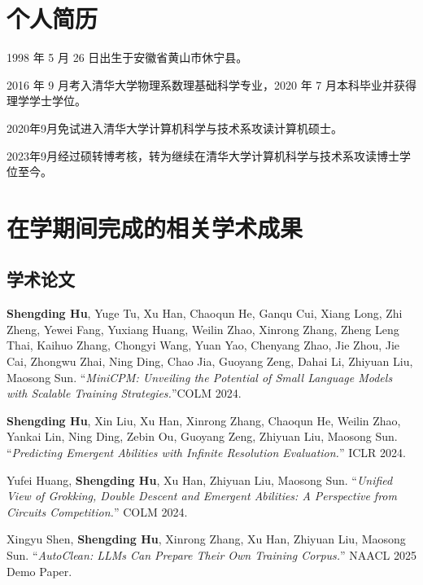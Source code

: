 
\begin{resume}

  \section*{个人简历}

  1998 年 5 月 26 日出生于安徽省黄山市休宁县。

  2016 年 9 月考入清华大学物理系数理基础科学专业，2020 年 7 月本科毕业并获得理学学士学位。

  2020年9月免试进入清华大学计算机科学与技术系攻读计算机硕士。

  2023年9月经过硕转博考核，转为继续在清华大学计算机科学与技术系攻读博士学位至今。


  \section*{在学期间完成的相关学术成果}

  \subsection*{学术论文}

  \begin{achievements}
      \item \textbf{Shengding Hu}, Yuge Tu, Xu Han, Chaoqun He, Ganqu Cui, Xiang Long, Zhi Zheng, Yewei Fang, Yuxiang Huang, Weilin Zhao, Xinrong Zhang, Zheng Leng Thai, Kaihuo Zhang, Chongyi Wang, Yuan Yao, Chenyang Zhao, Jie Zhou, Jie Cai, Zhongwu Zhai, Ning Ding, Chao Jia, Guoyang Zeng, Dahai Li, Zhiyuan Liu, Maosong Sun. ``\textit{MiniCPM: Unveiling the Potential of Small Language Models with Scalable Training Strategies.}''COLM 2024.
      
      \item \textbf{Shengding Hu}, Xin Liu, Xu Han, Xinrong Zhang, Chaoqun He, Weilin Zhao, Yankai Lin, Ning Ding, Zebin Ou, Guoyang Zeng, Zhiyuan Liu, Maosong Sun. ``\textit{Predicting Emergent Abilities with Infinite Resolution Evaluation.}'' ICLR 2024. 
  
      
      \item Yufei Huang, \textbf{Shengding Hu}, Xu Han, Zhiyuan Liu, Maosong Sun. ``\textit{Unified View of Grokking, Double Descent and Emergent Abilities: A Perspective from Circuits Competition.}'' COLM 2024.
      
      
      \item Xingyu Shen, \textbf{Shengding Hu}, Xinrong Zhang, Xu Han, Zhiyuan Liu, Maosong Sun. ``\textit{AutoClean: LLMs Can Prepare Their Own Training Corpus.}'' NAACL 2025 Demo Paper.
      

\end{achievements}
\end{resume}
